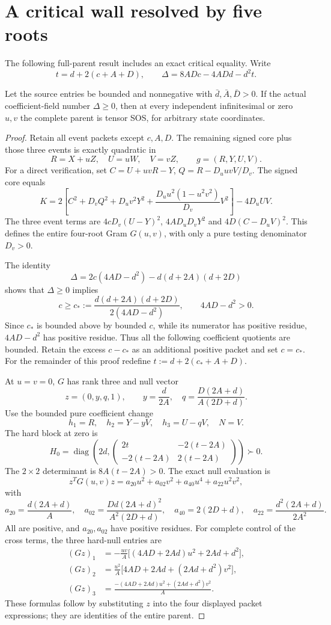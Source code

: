 \section{A critical wall resolved by five roots}\label{pe25c50379365:sec:wall}
The following full-parent result includes an exact critical equality. Write
\[
t=d+2(c+A+D),\qquad
\Delta=8ADc-4ADd-d^2t.
\]
\begin{theorem}\label{pe25c50379365:thm:wall}
Let the source entries be bounded and nonnegative with $\bar d,\bar A,\bar D>0$. If the actual coefficient-field number $\Delta\ge0$, then at every independent infinitesimal or zero $u,v$ the complete parent is tensor SOS, for arbitrary state coordinates.
\end{theorem}
\begin{proof}
Retain all event packets except $c,A,D$. The remaining signed core plus those three events is exactly quadratic in
\[
R=X+uZ,\quad U=uW,\quad V=vZ,\qquad g=(R,Y,U,V).
\]
For a direct verification, set $C=U+uvR-Y$, $Q=R-D_uuvV/D_v$. The signed core equals
\[
K=2\left[C^2+D_vQ^2+D_uv^2Y^2+
\frac{D_uu^2(1-u^2v^2)}{D_v}V^2\right]-4D_uUV.
\]
The three event terms are $4cD_v(U-Y)^2$, $4AD_uD_vY^2$ and $4D(C-D_uV)^2$. This defines the entire four-root Gram $G(u,v)$, with only a pure testing denominator $D_v>0$.

The identity
\[
\Delta=2c(4AD-d^2)-d(d+2A)(d+2D)
\]
shows that $\Delta\ge0$ implies
\[
c\ge c_*:=\frac{d(d+2A)(d+2D)}{2(4AD-d^2)},\qquad 4AD-d^2>0.
\]
Since $c_*$ is bounded above by bounded $c$, while its numerator has positive residue, $4AD-d^2$ has positive residue. Thus all the following coefficient quotients are bounded. Retain the excess $c-c_*$ as an additional positive packet and set $c=c_*$. For the remainder of this proof redefine $t:=d+2(c_*+A+D)$.

At $u=v=0$, $G$ has rank three and null vector
\[
z=(0,y,q,1),\qquad
y=\frac d{2A},\quad q=\frac{D(2A+d)}{A(2D+d)}.
\]
Use the bounded pure coefficient change
\[
h_1=R,\quad h_2=Y-yV,\quad h_3=U-qV,\quad N=V.
\]
The hard block at zero is
\[
H_0=\operatorname{diag}\!\left(2d,
\begin{pmatrix}2t&-2(t-2A)\\-2(t-2A)&2(t-2A)\end{pmatrix}\right)\succ0.
\]
The $2\times2$ determinant is $8A(t-2A)>0$. The exact null evaluation is
\[
z^TG(u,v)z=a_{20}u^2+a_{02}v^2+a_{40}u^4+a_{22}u^2v^2,
\]
with
\[
a_{20}=\frac{d(2A+d)}A,\quad
a_{02}=\frac{Dd(2A+d)^2}{A^2(2D+d)},\quad
a_{40}=2(2D+d),\quad
a_{22}=\frac{d^2(2A+d)}{2A^2}.
\]
All are positive, and $a_{20},a_{02}$ have positive residues. For complete control of the cross terms, the three hard-null entries are
\begin{align*}
(Gz)_1&=-\frac{uv}{A}\big[(4AD+2Ad)u^2+2Ad+d^2\big],\\
(Gz)_2&=\frac{u^2}{A}\big[4AD+2Ad+(2Ad+d^2)v^2\big],\\
(Gz)_3&=\frac{-(4AD+2Ad)u^2+(2Ad+d^2)v^2}{A}.
\end{align*}
These formulas follow by substituting $z$ into the four displayed packet expressions; they are identities of the entire parent.


\end{proof}
